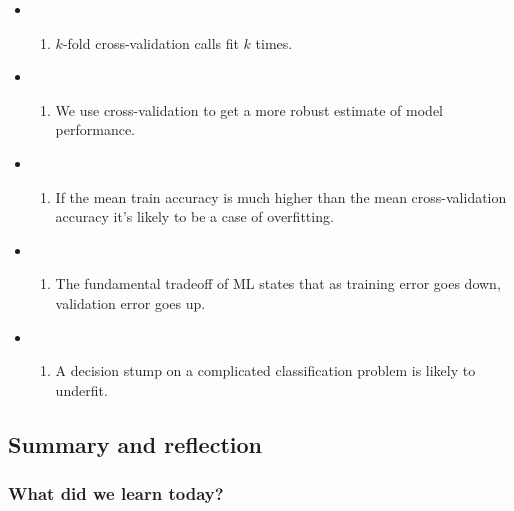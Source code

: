 \documentclass[11pt]{article}
\providecommand{\tightlist}{%
      \setlength{\itemsep}{0pt}\setlength{\parskip}{0pt}}
\begin{document}
\begin{itemize}
\tightlist
\item
  \begin{enumerate}
  \def\labelenumi{(\Alph{enumi})}
  \tightlist
  \item
    \(k\)-fold cross-validation calls fit \(k\) times.
  \end{enumerate}
\item
  \begin{enumerate}
  \def\labelenumi{(\Alph{enumi})}
  \setcounter{enumi}{1}
  \tightlist
  \item
    We use cross-validation to get a more robust estimate of model
    performance.
  \end{enumerate}
\item
  \begin{enumerate}
  \def\labelenumi{(\Alph{enumi})}
  \setcounter{enumi}{2}
  \tightlist
  \item
    If the mean train accuracy is much higher than the mean
    cross-validation accuracy it's likely to be a case of overfitting.
  \end{enumerate}
\item
  \begin{enumerate}
  \def\labelenumi{(\Alph{enumi})}
  \setcounter{enumi}{3}
  \tightlist
  \item
    The fundamental tradeoff of ML states that as training error goes
    down, validation error goes up.
  \end{enumerate}
\item
  \begin{enumerate}
  \def\labelenumi{(\Alph{enumi})}
  \setcounter{enumi}{4}
  \tightlist
  \item
    A decision stump on a complicated classification problem is likely
    to underfit.
  \end{enumerate}
\end{itemize}

    

    \subsection{Summary and reflection}\label{summary-and-reflection}

    \subsubsection{What did we learn today?}\label{what-did-we-learn-today}
\end{document}
